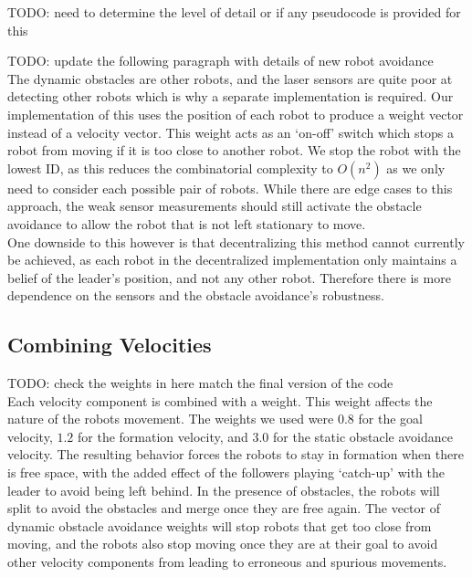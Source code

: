\documentclass[letterpaper, 10 pt, conference]{ieeeconf}  %
\begin{document}
TODO: need to determine the level of detail or if any pseudocode is provided for this

TODO: update the following paragraph with details of new robot avoidance \\

The dynamic obstacles are other robots, and the laser sensors are quite poor at detecting other robots which is why a separate implementation is required. Our implementation of this uses the position of each robot to produce a weight vector instead of a velocity vector. This weight acts as an `on-off' switch which stops a robot from moving if it is too close to another robot. We stop the robot with the lowest ID, as this reduces the combinatorial complexity to $O(n^{2})$ as we only need to consider each possible pair of robots. While there are edge cases to this approach, the weak sensor measurements should still activate the obstacle avoidance to allow the robot that is not left stationary to move. \\

One downside to this however is that decentralizing this method cannot currently be achieved, as each robot in the decentralized implementation only maintains a belief of the leader's position, and not any other robot. Therefore there is more dependence on the sensors and the obstacle avoidance's robustness.

\subsection{Combining Velocities}

TODO: check the weights in here match the final version of the code \\

Each velocity component is combined with a weight. This weight affects the nature of the robots movement. The weights we used were $0.8$ for the goal velocity, $1.2$ for the formation velocity, and $3.0$ for the static obstacle avoidance velocity. The resulting behavior forces the robots to stay in formation when there is free space, with the added effect of the followers playing `catch-up' with the leader to avoid being left behind. In the presence of obstacles, the robots will split to avoid the obstacles and merge once they are free again. The vector of dynamic obstacle avoidance weights will stop robots that get too close from moving, and the robots also stop moving once they are at their goal to avoid other velocity components from leading to erroneous and spurious movements. \\
\end{document}
